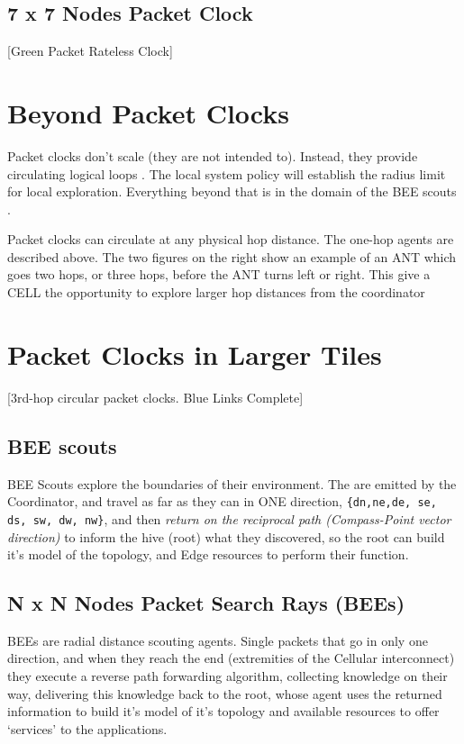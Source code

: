 \documentclass[../../../OAE-SPEC-MAIN.tex]{subfiles}
\begin{document}
\subsection{7 x 7 Nodes Packet Clock}
\marginnote{}

[Green Packet Rateless Clock]

\section{Beyond Packet Clocks}

Packet clocks don't scale (they are not intended to). Instead, they provide circulating logical loops \cite{Logical Clocks}.  The local system policy will establish the radius limit for local exploration. Everything beyond that is in the domain of the BEE scouts .

Packet clocks can circulate at any physical hop distance. The one-hop agents are described above.  The two figures on the right show an example of an ANT which goes two hops, or three hops, before the ANT turns left or right.  This give a CELL the opportunity to explore larger hop distances from the coordinator

\section{Packet Clocks in Larger Tiles}

[3rd-hop circular packet clocks. Blue Links Complete]

\subsection{BEE scouts}

BEE Scouts explore the boundaries of their environment.  The are emitted by the Coordinator, and travel as far as they can in ONE direction, \texttt{\{dn,ne,de, se, ds, sw, dw, nw\}}, and then \emph{return on the reciprocal path (Compass-Point vector direction)} to inform the hive (root) what they discovered, so the root can build it's model of the topology, and Edge resources to perform their function. 

\subsection{N x N Nodes Packet Search Rays (BEEs)}

BEEs  are radial distance scouting agents. Single packets that go in only one direction, and when they reach the end (extremities of the Cellular interconnect) they execute a reverse path forwarding algorithm, collecting knowledge on their way, delivering this knowledge back to the root, whose agent  uses the returned information to build it's model of it's topology and available resources to offer `services' to the applications.
\end{document}

